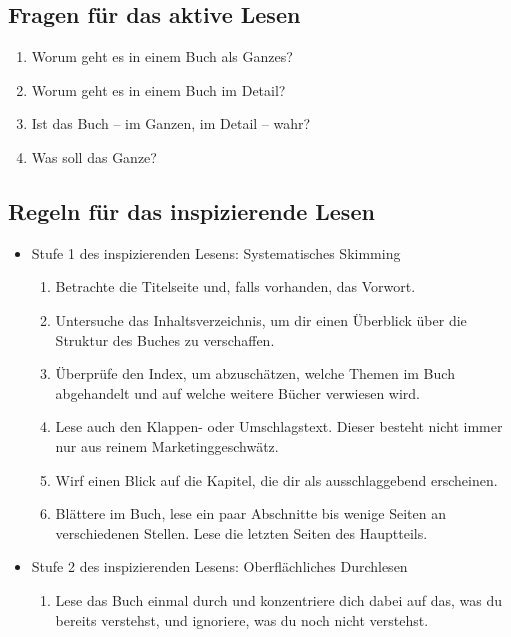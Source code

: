 \documentclass[a4paper,11pt]{scrartcl}
\begin{document}
\subsection*{Fragen für das aktive Lesen}

\begin{enumerate}
    \item Worum geht es in einem Buch als Ganzes?
    \item Worum geht es in einem Buch im Detail?
    \item Ist das Buch – im Ganzen, im Detail – wahr?
    \item Was soll das Ganze?
\end{enumerate}

\subsection*{Regeln für das inspizierende Lesen}

\begin{itemize}
    \item Stufe 1 des inspizierenden Lesens: Systematisches Skimming
    \begin{enumerate}
        \item Betrachte die Titelseite und, falls vorhanden, das Vorwort.
        \item Untersuche das Inhaltsverzeichnis, um dir einen Überblick über die Struktur des Buches zu verschaffen.
        \item Überprüfe den Index, um abzuschätzen, welche Themen im Buch abgehandelt und auf welche weitere Bücher verwiesen wird.
        \item Lese auch den Klappen- oder Umschlagstext. Dieser besteht nicht immer nur aus reinem Marketinggeschwätz.
        \item Wirf einen Blick auf die Kapitel, die dir als ausschlaggebend erscheinen.
        \item Blättere im Buch, lese ein paar Abschnitte bis wenige Seiten an verschiedenen Stellen. Lese die letzten Seiten des Hauptteils.
    \end{enumerate}
    \item Stufe 2 des inspizierenden Lesens: Oberflächliches Durchlesen
    \begin{enumerate}
        \item Lese das Buch einmal durch und konzentriere dich dabei auf das, was du bereits verstehst, und ignoriere, was du noch nicht verstehst.
    \end{enumerate}
\end{itemize}
\end{document}
